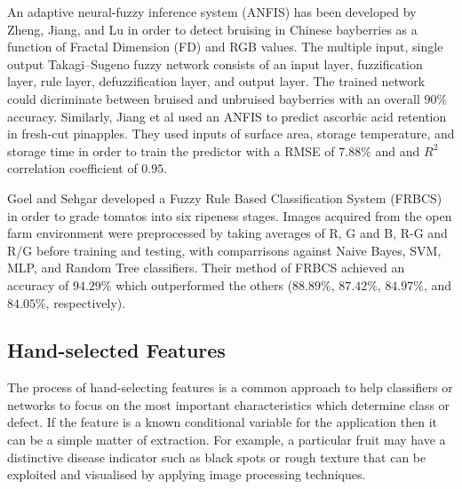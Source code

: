 \documentclass[fleqn,twoside]{article}
\begin{document}
An adaptive neural-fuzzy inference system (ANFIS) has been developed by Zheng, Jiang, and Lu \cite{zheng} in order to detect bruising in Chinese bayberries as a function of Fractal Dimension (FD) and RGB values. The multiple input, single output Takagi–Sugeno fuzzy network consists of an input layer, fuzzification layer, rule layer, defuzzification layer, and output layer. The trained network could dicriminate between bruised and unbruised bayberries with an overall $90\%$ accuracy. Similarly, Jiang et al \cite{jiang} used an ANFIS to predict ascorbic acid retention in fresh-cut pinapples. They used inputs of surface area, storage temperature, and storage time in order to train the predictor with a RMSE of $7.88\%$ and and $R^2$ correlation coefficient of $0.95$.

Goel and Sehgar \cite{goel} developed a Fuzzy Rule Based Classification System (FRBCS) in order to grade tomatos into six ripeness stages. Images acquired from the open farm environment were preprocessed by taking averages of R, G and B, R-G and R/G before training and testing, with comparrisons against Naive Bayes, SVM, MLP, and Random Tree classifiers. Their method of FRBCS achieved an accuracy of $94.29\%$ which outperformed the others ($88.89\%$, $87.42\%$, $84.97\%$, and $84.05\%$, respectively).  




\subsection{Hand-selected Features}

The process of hand-selecting features is a common approach to help classifiers or networks to focus on the most important characteristics which determine class or defect. If the feature is a known conditional variable for the application then it can be a simple matter of extraction. For example, a particular fruit may have a distinctive disease indicator such as black spots or rough texture that can be exploited and visualised by applying image processing techniques. 
\end{document}
